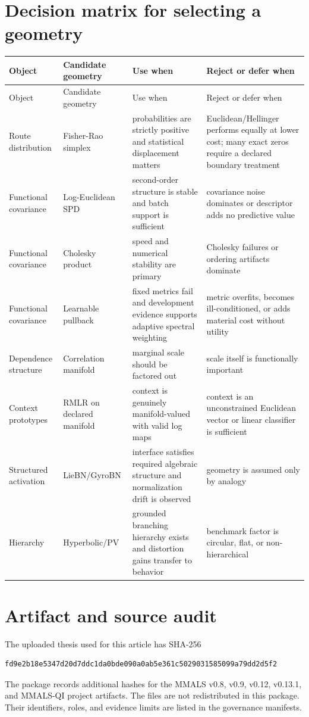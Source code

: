 \appendix
\section{Decision matrix for selecting a geometry}
\begin{center}
\begin{longtable}{@{}p{}p{}p{}p{}@{}}
\toprule
Object & Candidate geometry & Use when & Reject or defer when \\
\midrule
\endfirsthead
\toprule
Object & Candidate geometry & Use when & Reject or defer when \\
\midrule
\endhead
Route distribution & Fisher-Rao simplex & probabilities are strictly positive and statistical displacement matters & Euclidean/Hellinger performs equally at lower cost; many exact zeros require a declared boundary treatment \\
Functional covariance & Log-Euclidean SPD & second-order structure is stable and batch support is sufficient & covariance noise dominates or descriptor adds no predictive value \\
Functional covariance & Cholesky product & speed and numerical stability are primary & Cholesky failures or ordering artifacts dominate \\
Functional covariance & Learnable pullback & fixed metrics fail and development evidence supports adaptive spectral weighting & metric overfits, becomes ill-conditioned, or adds material cost without utility \\
Dependence structure & Correlation manifold & marginal scale should be factored out & scale itself is functionally important \\
Context prototypes & RMLR on declared manifold & context is genuinely manifold-valued with valid log maps & context is an unconstrained Euclidean vector or linear classifier is sufficient \\
Structured activation & LieBN/GyroBN & interface satisfies required algebraic structure and normalization drift is observed & geometry is assumed only by analogy \\
Hierarchy & Hyperbolic/PV & grounded branching hierarchy exists and distortion gains transfer to behavior & benchmark factor is circular, flat, or non-hierarchical \\
\bottomrule
\end{longtable}
\end{center}


\section{Artifact and source audit}
The uploaded thesis used for this article has SHA-256
\begin{verbatim}
fd9e2b18e5347d20d7ddc1da0bde090a0ab5e361c5029031585099a79dd2d5f2
\end{verbatim}
The package records additional hashes for the MMALS v0.8, v0.9, v0.12, v0.13.1, and MMALS-QI project artifacts. The files are not redistributed in this package. Their identifiers, roles, and evidence limits are listed in the governance manifests.


